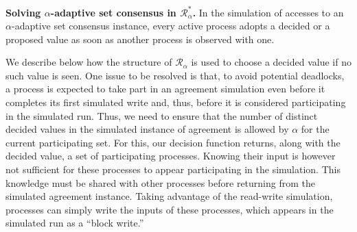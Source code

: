 \documentclass[a4paper]{article}
\newcommand{\myparagraph}[1]{\vspace{6pt}\noindent \textbf{#1}}
\def\R{\ensuremath{\mathcal{R}}}
\begin{document}
\myparagraph{Solving $\alpha$-adaptive set consensus in $\R_\alpha^*$.}
%
%
In the simulation of accesses to an $\alpha$-adaptive set consensus
instance, every active process adopts a decided or a proposed
value as soon as another process is observed with one.
%

We describe below how the structure of $\R_{\alpha}$ is used to choose
a decided value if no such value is seen.   
%
%
One issue to be resolved is that, to avoid potential deadlocks, a process
is expected to take part in an agreement simulation even before it
completes its first simulated write and, thus, before it is considered
participating in the simulated run. 
Thus, we need to ensure that the number of distinct decided values in
the simulated instance of agreement is allowed by $\alpha$ for the current
participating set.
%
For this, our decision function returns, along with the decided value,
a set of participating processes. Knowing their input is however not
sufficient for these processes to appear participating in the
simulation. This knowledge must be shared with other processes before returning
from the simulated agreement instance. Taking advantage of the read-write
simulation, processes can simply write the inputs of these
processes, which appears in the simulated run as a ``block write.''
\end{document}

